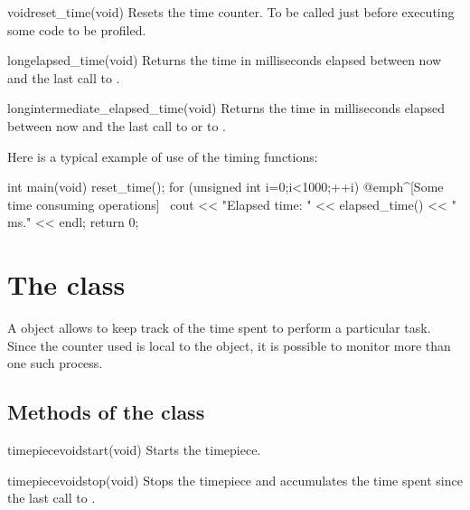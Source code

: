 \documentclass{manual}
\begin{document}
\begin{deffun}{void}{reset\_time}{(void)}
  Resets the time counter. To be called just before executing some code to be
  profiled.
\end{deffun}

\begin{deffun}{long}{elapsed\_time}{(void)}
  Returns the time in milliseconds elapsed between now and the last call to
  .
\end{deffun}

\begin{deffun}{long}{intermediate\_elapsed\_time}{(void)}
  Returns the time in milliseconds elapsed between now and the last call to
   or to .
\end{deffun}

Here is a typical example of use of the timing functions:

\begin{example}
int main(void)
{
  reset_time();
  for (unsigned int i=0;i<1000;++i) {
     @emph^[Some time consuming operations]~
  }
  cout << "Elapsed time: " << elapsed_time() << " ms." << endl;
  return 0;
}
\end{example}

\section{The  class}\label{sec:timepiece}

A  object allows to keep track of the time spent to perform
a particular task. Since the counter used is local to the object, it is possible
to monitor more than one such process.

\subsection{Methods of the  class}

\begin{defmethod}{timepiece}{void}{start}{(void)}
  Starts the timepiece.
\end{defmethod}

\begin{defmethod}{timepiece}{void}{stop}{(void)}
  Stops the timepiece and accumulates the time spent since the last call to .
\end{defmethod}
\end{document}
